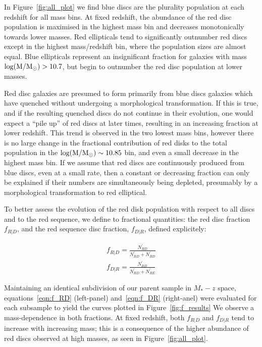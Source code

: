 \documentclass[useAMS,usenatbib]{mn2e}
\begin{document}
In Figure~\ref{fig:all_plot} we find blue discs are the plurality population at each redshift for all mass bins. At fixed redshift, the abundance of the red disc population is maximised in the highest mass bin and decreases monotonically towards lower masses. Red ellipticals tend to significantly outnumber red discs except in the highest mass/redshift bin, where the population sizes are almost equal. Blue ellipticals represent an insignificant fraction for galaxies with mass $\rm log(M/M_{\odot})>10.7$, but begin to outnumber the red disc population at lower masses. 


Red disc galaxies are presumed to form primarily from blue discs galaxies which have quenched without undergoing a morphological transformation. If this is true, and if the resulting quenched discs do not continue in their evolution, one would expect a ``pile up'' of red discs at later times, resulting in an increasing fraction at lower redshift. This trend is observed in the two lowest mass bins, however there is no large change in the fractional contribution of red disks to the total population in the $\rm log(M/M_{\odot})\sim10.85$ bin, and even a small decrease in the highest mass bin. If we assume that red discs are continuously produced from blue discs, even at a small rate, then a constant or decreasing fraction can only be explained if their numbers are simultaneously being depleted, presumably by a morphological transformation to red elliptical.

To better assess the evolution of the red disk population with respect to all discs and to the red sequence, we define to fractional quantities: the red disc fraction $f_{R|D}$, and the red sequence disc fraction, $f_{D|R}$, defined explicitely:

\begin{align}
f_{R|D} = \frac{N^{'}_{RD}}{N^{'}_{RD}+N^{'}_{BD}} \label{eqn:f_RD}\\
f_{D|R} = \frac{N^{'}_{RD}}{N^{'}_{RD}+N^{'}_{RE}}
\label{eqn:f_DR}
\end{align}


Maintaining an identical subdivision of our parent sample in $M_{*}-z$ space, equations~\ref{eqn:f_RD} (left-panel) and~\ref{eqn:f_DR} (right-anel) were evaluated for each subsample to yield the curves plotted in Figure~\ref{fig:f_results} We observe a mass-dependence in both fractions. At fixed redshift, both $f_{R|D}$ and $f_{D|R}$ tend to increase with increasing mass; this is a consequence of the higher abundance of red discs observed at high masses, as seen in Figure~\ref{fig:all_plot}. 
\end{document}
